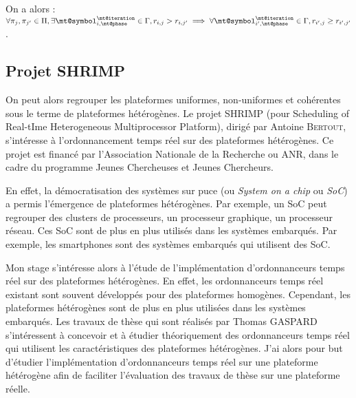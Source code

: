 On a alors : 
$\forall\proc{j},\proc{j'}\in\pset,\exists\task{i}\in\tset,\trate{i}{j}>\trate{i}{j'}\implies\forall\task{i'}\in\tset,\trate{i'}{j}\geq\trate{i'}{j'}$. 


\subsection{Projet SHRIMP}

On peut alors regrouper les plateformes uniformes, non-uniformes et cohérentes sous le terme de plateformes hétérogènes. Le projet SHRIMP (pour Scheduling of Real-tIme Heterogeneous Multiprocessor Platform), dirigé par Antoine \textsc{Bertout}, s'intéresse à l'ordonnancement temps réel sur des plateformes hétérogènes. Ce projet est financé par l'Association Nationale de la Recherche ou ANR, dans le cadre du programme Jeunes Chercheuses et Jeunes Chercheurs.

En effet, la démocratisation des systèmes sur puce (ou \textit{System on a chip} ou \textit{SoC}) a permis l'émergence de plateformes hétérogènes. Par exemple, un SoC peut regrouper des clusters de processeurs, un processeur graphique, un processeur réseau. Ces SoC sont de plus en plus utilisés dans les systèmes embarqués. Par exemple, les smartphones sont des systèmes embarqués qui utilisent des SoC. 

Mon stage s'intéresse alors à l'étude de l'implémentation d'ordonnanceurs temps réel sur des plateformes hétérogènes. En effet, les ordonnanceurs temps réel existant sont souvent développés pour des plateformes homogènes. Cependant, les plateformes hétérogènes sont de plus en plus utilisées dans les systèmes embarqués. Les travaux de thèse qui sont réalisés par Thomas GASPARD s'intéressent à concevoir et à étudier théoriquement des ordonnanceurs temps réel qui utilisent les caractéristiques des plateformes hétérogènes. J'ai alors pour but d'étudier l'implémentation d'ordonnanceurs temps réel sur une plateforme hétérogène afin de faciliter l'évaluation des travaux de thèse sur une plateforme réelle.